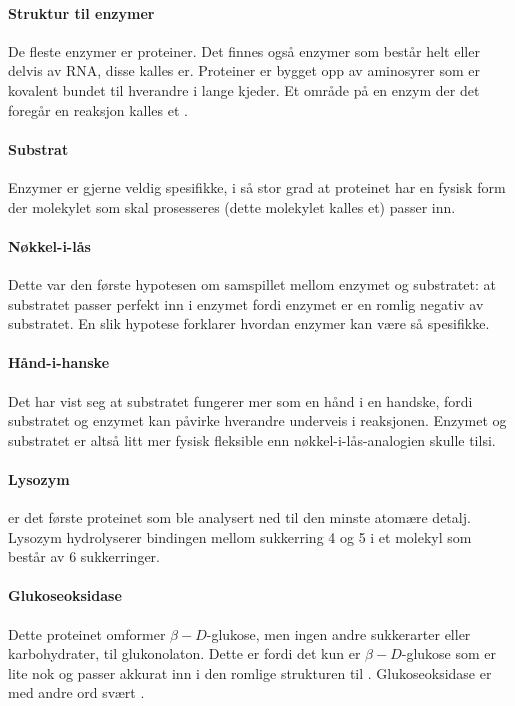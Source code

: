 \paragraph{Struktur til enzymer} De fleste enzymer er proteiner. Det finnes også enzymer som består helt eller delvis av RNA, disse kalles er. Proteiner er bygget opp av aminosyrer som er kovalent bundet til hverandre i lange kjeder. Et område på en enzym der det foregår en reaksjon kalles et .

\paragraph{Substrat} Enzymer er gjerne veldig spesifikke, i så stor grad at proteinet har en fysisk form der molekylet som skal prosesseres (dette molekylet kalles et) passer inn. 

\paragraph{Nøkkel-i-lås} Dette var den første hypotesen om samspillet mellom enzymet og substratet: at substratet passer perfekt inn i enzymet fordi enzymet er en romlig negativ av substratet. En slik hypotese forklarer hvordan enzymer kan være så spesifikke.

\paragraph{Hånd-i-hanske} Det har vist seg at substratet fungerer mer som en hånd i en handske, fordi substratet og enzymet kan påvirke hverandre underveis i reaksjonen. Enzymet og substratet er altså litt mer fysisk fleksible enn nøkkel-i-lås-analogien skulle tilsi.

\paragraph{Lysozym} er det første proteinet som ble analysert ned til den minste atomære detalj. Lysozym hydrolyserer bindingen mellom sukkerring 4 og 5 i et molekyl som består av 6 sukkerringer. 

\paragraph{Glukoseoksidase} Dette proteinet omformer $\beta-D$-glukose, men ingen andre sukkerarter eller karbohydrater, til glukonolaton. Dette er fordi det kun er $\beta-D$-glukose som er lite nok og passer akkurat inn i den romlige strukturen til . Glukoseoksidase er med andre ord svært .

